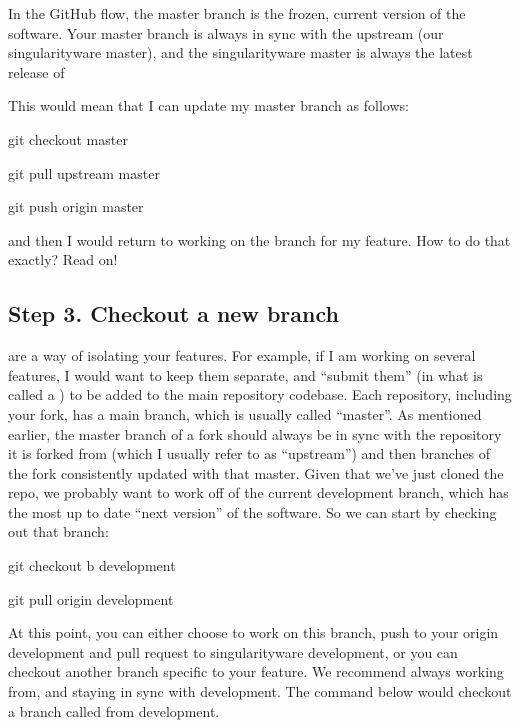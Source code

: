 \documentclass[letterpaper,10pt,english]{sphinxmanual}
\begin{document}
In the GitHub flow, the master branch is the frozen, current version of the software.
Your master branch is always in sync with the upstream (our singularityware master), and the singularityware master is always the latest release of

This would mean that I can update my master branch as follows:

%
\begin{sphinxVerbatim}[commandchars=\\\{\}]
git checkout master

git pull upstream master

git push origin master
\end{sphinxVerbatim}

and then I would return to working on the branch for my feature. How to do that exactly? Read on!


\subsection{Step 3. Checkout a new branch}
\label{\detokenize{contributing:step-3-checkout-a-new-branch}}
 are a way of isolating your features. For example, if I am working on several features, I would want to keep them separate, and “submit them” (in what is called a  ) to be added to the main repository codebase. Each repository, including your fork, has a main branch, which is usually called “master”. As mentioned earlier, the master branch of a fork should always be in sync with the repository it is forked from (which I usually refer to as “upstream”) and then branches of the fork consistently updated with that master. Given that we’ve just cloned the repo, we probably want to work off of the current development branch, which has the most up to date “next version” of the software. So we can start by checking out that branch:

%
\begin{sphinxVerbatim}[commandchars=\\\{\}]
git checkout \PYGZhy{}b development

git pull origin development
\end{sphinxVerbatim}

At this point, you can either choose to work on this branch, push to your origin development and pull request to singularityware development, or you can checkout another branch specific to your feature. We recommend always working from, and staying in sync with development. The command below would checkout a branch called  from development.
\end{document}
